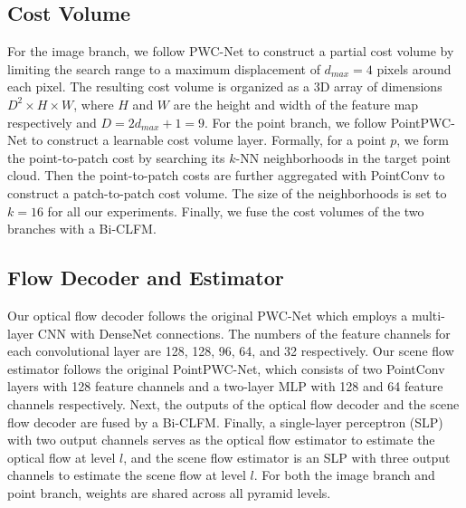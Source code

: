 \documentclass[10pt,twocolumn,letterpaper]{article}
\begin{document}
\subsection{Cost Volume} For the image branch, we follow PWC-Net to construct a partial cost volume by limiting the search range to a maximum displacement of $d_{max}=4$ pixels around each pixel. The resulting cost volume is organized as a 3D array of dimensions $D^2 \times H \times W$, where $H$ and $W$ are the height and width of the feature map respectively and $D = 2d_{max} + 1 = 9$. For the point branch, we follow PointPWC-Net to construct a learnable cost volume layer. Formally, for a point $p$, we form the point-to-patch cost by searching its $k$-NN neighborhoods in the target point cloud. Then the point-to-patch costs are further aggregated with PointConv to construct a patch-to-patch cost volume. The size of the neighborhoods is set to $k=16$ for all our experiments. Finally, we fuse the cost volumes of the two branches with a Bi-CLFM.

\subsection{Flow Decoder and Estimator} Our optical flow decoder follows the original PWC-Net which employs a multi-layer CNN with DenseNet \cite{huang2017densenet} connections. The numbers of the feature channels for each convolutional layer are 128, 128, 96, 64, and 32 respectively. Our scene flow estimator follows the original PointPWC-Net, which consists of two PointConv layers with 128 feature channels and a two-layer MLP with 128 and 64 feature channels respectively. Next, the outputs of the optical flow decoder and the scene flow decoder are fused by a Bi-CLFM. Finally, a single-layer perceptron (SLP) with two output channels serves as the optical flow estimator to estimate the optical flow at level $l$, and the scene flow estimator is an SLP with three output channels to estimate the scene flow at level $l$. For both the image branch and point branch, weights are shared across all pyramid levels.
\end{document}
